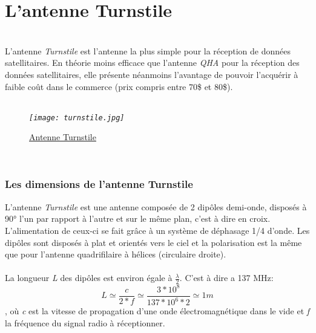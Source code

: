 \documentclass[12pt,fleqn]{book} %
\begin{document}
\section{L'antenne Turnstile}
~\\\indent L'antenne \emph{Turnstile} est l'antenne la plus simple pour la réception de données satellitaires. En théorie moins efficace que l'antenne \emph{QHA} pour la réception des données satellitaires, elle présente néanmoins l'avantage de pouvoir l'acquérir à faible coût dans le commerce (prix compris entre 70\$ et 80\$).
~\\\\
\begin{figure}[H]
	\centering
	\itshape
	\texttt{[image: turnstile.jpg]}
	\caption{\label{turnstile} \underline{Antenne Turnstile}}
\end{figure}
~\\
\subsubsection{Les dimensions de l'antenne Turnstile}
\noindent L'antenne \emph{Turnstile} est une antenne composée de 2 dipôles demi-onde, disposés à 90° l'un par rapport à l'autre et sur le même plan, c'est à dire en croix. L'alimentation de ceux-ci se fait grâce à un système de déphasage 1/4 d'onde. Les dipôles sont disposés à plat et orientés vers le ciel et la polarisation est la même que pour l'antenne quadrifilaire à hélices (circulaire droite).
~\\\\La longueur \emph{L} des dipôles est environ égale à \(\frac{\lambda}{2}\). C'est à dire a 137 MHz:
$$ L\simeq\frac{c}{2*f}\simeq \frac{3*10^8}{137*10^6*2}\simeq1 m$$, où \emph{c} est la vitesse de propagation d'une onde électromagnétique dans le vide et \emph{f} la fréquence du signal radio à réceptionner.
~\\\\
\end{document}
